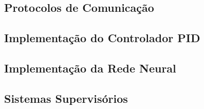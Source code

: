 \subsection{Protocolos de Comunicação}

\subsection{Implementação do Controlador PID}

\subsection{Implementação da Rede Neural}

\subsection{Sistemas Supervisórios}

\lipsum[9-30]

